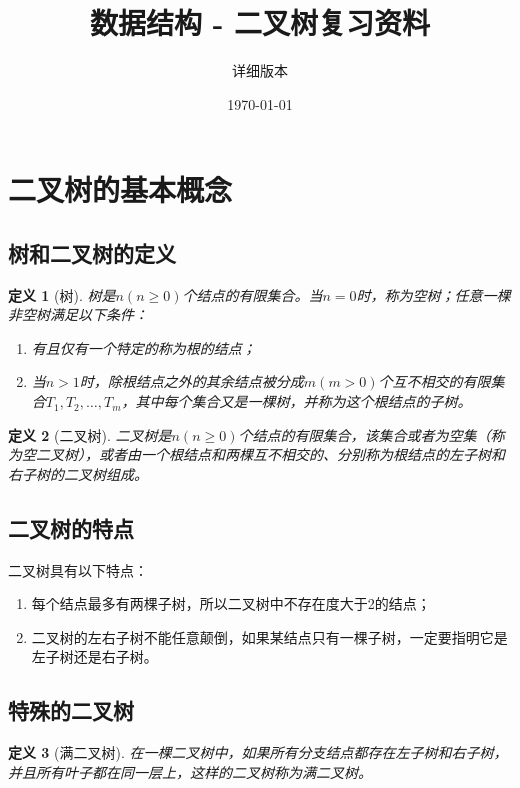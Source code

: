 \documentclass[12pt,a4paper]{amsart}
\title{\textbf{数据结构 - 二叉树复习资料}}
\author{详细版本}
\date{\today}
\newtheorem{definition}{定义}[section]
\begin{document}


\section{二叉树的基本概念}

\subsection{树和二叉树的定义}

\begin{definition}[树]
树是$n(n \geq 0)$个结点的有限集合。当$n=0$时，称为空树；任意一棵非空树满足以下条件：
\begin{enumerate}
\item 有且仅有一个特定的称为根的结点；
\item 当$n>1$时，除根结点之外的其余结点被分成$m(m>0)$个互不相交的有限集合$T_1, T_2, \ldots, T_m$，其中每个集合又是一棵树，并称为这个根结点的子树。
\end{enumerate}
\end{definition}

\begin{definition}[二叉树]
二叉树是$n(n \geq 0)$个结点的有限集合，该集合或者为空集（称为空二叉树），或者由一个根结点和两棵互不相交的、分别称为根结点的左子树和右子树的二叉树组成。
\end{definition}

\subsection{二叉树的特点}

二叉树具有以下特点：
\begin{enumerate}
\item 每个结点最多有两棵子树，所以二叉树中不存在度大于2的结点；
\item 二叉树的左右子树不能任意颠倒，如果某结点只有一棵子树，一定要指明它是左子树还是右子树。
\end{enumerate}

\subsection{特殊的二叉树}

\begin{definition}[满二叉树]
在一棵二叉树中，如果所有分支结点都存在左子树和右子树，并且所有叶子都在同一层上，这样的二叉树称为满二叉树。
\end{definition}
\end{document}
